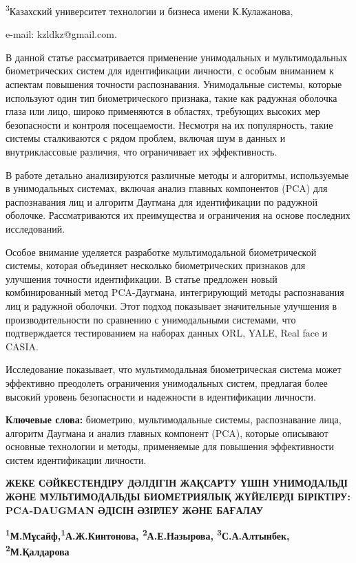 \textsuperscript{3}Казахский университет технологии и бизнеса имени
К.Кулажанова,

e-mail: kzldkz@gmail.com.

В данной статье рассматривается применение унимодальных и
мультимодальных биометрических систем для идентификации личности, с
особым вниманием к аспектам повышения точности распознавания.
Унимодальные системы, которые используют один тип биометрического
признака, такие как радужная оболочка глаза или лицо, широко применяются
в областях, требующих высоких мер безопасности и контроля посещаемости.
Несмотря на их популярность, такие системы сталкиваются с рядом проблем,
включая шум в данных и внутриклассовые различия, что ограничивает их
эффективность.

В работе детально анализируются различные методы и алгоритмы,
используемые в унимодальных системах, включая анализ главных компонентов
(PCA) для распознавания лиц и алгоритм Даугмана для идентификации по
радужной оболочке. Рассматриваются их преимущества и ограничения на
основе последних исследований.

Особое внимание уделяется разработке мультимодальной биометрической
системы, которая объединяет несколько биометрических признаков для
улучшения точности идентификации. В статье предложен новый
комбинированный метод PCA-Даугмана, интегрирующий методы распознавания
лиц и радужной оболочки. Этот подход показывает значительные улучшения в
производительности по сравнению с унимодальными системами, что
подтверждается тестированием на наборах данных ORL, YALE, Real face и
CASIA.

Исследование показывает, что мультимодальная биометрическая система
может эффективно преодолеть ограничения унимодальных систем, предлагая
более высокий уровень безопасности и надежности в идентификации
личности.

\textbf{Ключевые слова:} биометрию, мультимодальные системы,
распознавание лица, алгоритм Даугмана и анализ главных компонент (PCA),
которые описывают основные технологии и методы, применяемые для
повышения эффективности систем идентификации личности.

\textbf{ЖЕКЕ СӘЙКЕСТЕНДІРУ ДӘЛДІГІН ЖАҚСАРТУ ҮШІН УНИМОДАЛЬДІ ЖӘНЕ
МУЛЬТИМОДАЛЬДЫ БИОМЕТРИЯЛЫҚ ЖҮЙЕЛЕРДІ БІРІКТІРУ: PCA-DAUGMAN ӘДІСІН
ӘЗІРЛЕУ ЖӘНЕ БАҒАЛАУ}

\textbf{\textsuperscript{1}М.Мұсайф,\textsuperscript{1}А.Ж.Кинтонова,
\textsuperscript{2}А.Е.Назырова, \textsuperscript{3}С.А.Алтынбек,
\textsuperscript{2}М.Қалдарова}

